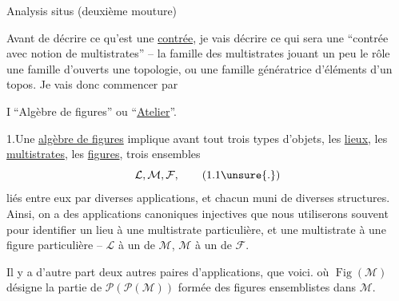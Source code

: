 \begin{center}Analysis situs (deuxième mouture)\end{center}

Avant de décrire ce qu'est une \uline{contrée}, je vais décrire ce qui sera une ``contrée avec notion de multistrates'' -- la famille des multistrates  jouant un peu le rôle  une famille d'ouverts   une topologie, ou une famille génératrice d'éléments d'un topos. Je vais donc commencer par

\textcircled{I}\quad ``Algèbre de figures'' ou ``\uline{Atelier}''.

1.\quad Une \uline{algèbre de figures} implique avant tout trois types d'objets, les \uline{lieux}, les \uline{multistrates}, les \uline{figures},  trois ensembles
\[
\mathcal{L},\mathcal{M},\mathcal{F},\tag*{(1.1\unsure{.})}
\]
liés entre eux par diverses applications, et chacun muni de diverses structures. Ainsi, on a des applications canoniques injectives
que nous utiliserons souvent pour identifier un lieu à une multistrate particulière, et une multistrate à une figure particulière -- $\mathcal{L}$ à un  de $\mathcal{M}$, $\mathcal{M}$ à un  de $\mathcal{F}$.

Il y a d'autre part deux autres paires d'applications, que voici.
où $\operatorname{Fig}(\mathcal{M})$ désigne la partie de $\mathcal{P}(\mathcal{P}(\mathcal{M}))$ formée des figures ensemblistes dans $\mathcal{M}$. 

